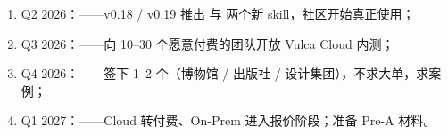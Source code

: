 \begin{enumerate}
  \item Q2 2026：——v0.18 / v0.19 推出  与  两个新 skill，社区开始真正使用；
  \item Q3 2026：——向 10–30 个愿意付费的团队开放 Vulca Cloud 内测；
  \item Q4 2026：——签下 1–2 个（博物馆 / 出版社 / 设计集团），不求大单，求案例；
  \item Q1 2027：——Cloud 转付费、On-Prem 进入报价阶段；准备 Pre-A 材料。
\end{enumerate}
